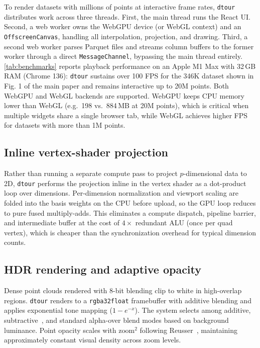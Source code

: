 \documentclass[11pt]{article}
\newcommand{\dtour}{\texorpdfstring{\texttt{dtour}\xspace}{dtour}}
\begin{document}
To render datasets with millions of points at interactive frame rates, \dtour{} distributes work across three threads. First, the main thread runs the React UI. Second, a web worker owns the WebGPU device (or WebGL context) and an \texttt{OffscreenCanvas}, handling all interpolation, projection, and drawing. Third, a second web worker parses Parquet files and streams column buffers to the former worker through a direct \texttt{MessageChannel}, bypassing the main thread entirely. \autoref{tab:benchmarks} reports playback performance on an Apple M1 Max with 32\,GB RAM (Chrome 136): \dtour{} sustains over 100 FPS for the 346K dataset shown in Fig. 1 of the main paper and remains interactive up to 20M points. Both WebGPU and WebGL backends are supported. WebGPU keeps CPU memory lower than WebGL (e.g.\ 198 vs.\ 884\,MB at 20M points), which is critical when multiple widgets share a single browser tab, while WebGL achieves higher FPS for datasets with more than 1M points.

\subsection{Inline vertex-shader projection}
Rather than running a separate compute pass to project $p$-dimensional data to 2D, \dtour{} performs the projection inline in the vertex shader as a dot-product loop over dimensions. Per-dimension normalization and viewport scaling are folded into the basis weights on the CPU before upload, so the GPU loop reduces to pure fused multiply-adds. This eliminates a compute dispatch, pipeline barrier, and intermediate buffer at the cost of $4\times$ redundant ALU (once per quad vertex), which is cheaper than the synchronization overhead for typical dimension counts.

\subsection{HDR rendering and adaptive opacity}
Dense point clouds rendered with 8-bit blending clip to white in high-overlap regions. \dtour{} renders to a \texttt{rgba32float} framebuffer with additive blending and applies exponential tone mapping ($1 - e^{-x}$). The system selects among additive, subtractive~\cite{reusser2022opacity}, and standard alpha-over blend modes based on background luminance. Point opacity scales with $\mathrm{zoom}^2$ following Reusser~\cite{reusser2022opacity}, maintaining approximately constant visual density across zoom levels.
\end{document}
